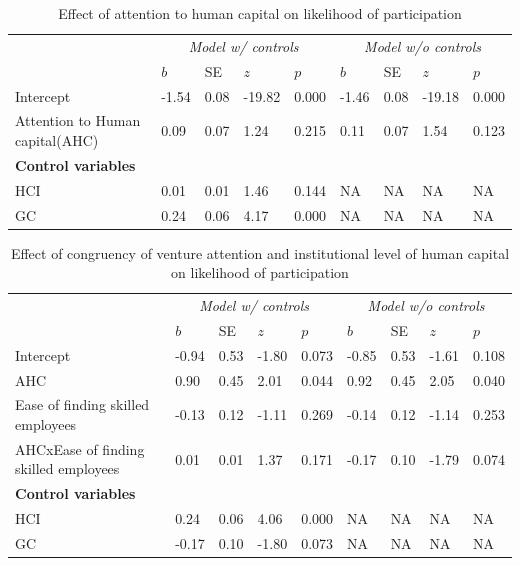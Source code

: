 \documentclass[
  english,
  man]{apa6}
\begin{document}
\begin{table}

\caption{\label{tab:unnamed-chunk-18}Effect of attention to human capital on likelihood of participation}
\centering
\begin{tabular}[t]{l|l|l|l|l|l|l|l|l}
\hline
\multicolumn{1}{c|}{\em{ }} & \multicolumn{4}{c|}{\em{Model w/ controls}} & \multicolumn{4}{c}{\em{Model w/o controls}} \\
\cline{2-5} \cline{6-9}
  & $b$ & SE & $z$ & $p$ & $b$ & SE & $z$ & $p$\\
\hline
Intercept & -1.54 & 0.08 & -19.82 & 0.000 & -1.46 & 0.08 & -19.18 & 0.000\\
\hline
Attention to Human capital(AHC) & 0.09 & 0.07 & 1.24 & 0.215 & 0.11 & 0.07 & 1.54 & 0.123\\
\hline
\multicolumn{9}{l}{\textbf{Control variables}}\\
\hline
\hspace{1em}HCI & 0.01 & 0.01 & 1.46 & 0.144 & NA & NA & NA & NA\\
\hline
\hspace{1em}GC & 0.24 & 0.06 & 4.17 & 0.000 & NA & NA & NA & NA\\
\hline
\end{tabular}
\end{table}

\begin{table}

\caption{\label{tab:unnamed-chunk-18}Effect of congruency of venture attention and institutional level of human capital on likelihood of participation}
\centering
\begin{tabular}[t]{l|l|l|l|l|l|l|l|l}
\hline
\multicolumn{1}{c|}{\em{ }} & \multicolumn{4}{c|}{\em{Model w/ controls}} & \multicolumn{4}{c}{\em{Model w/o controls}} \\
\cline{2-5} \cline{6-9}
  & $b$ & SE & $z$ & $p$ & $b$ & SE & $z$ & $p$\\
\hline
Intercept & -0.94 & 0.53 & -1.80 & 0.073 & -0.85 & 0.53 & -1.61 & 0.108\\
\hline
AHC & 0.90 & 0.45 & 2.01 & 0.044 & 0.92 & 0.45 & 2.05 & 0.040\\
\hline
Ease of finding skilled employees & -0.13 & 0.12 & -1.11 & 0.269 & -0.14 & 0.12 & -1.14 & 0.253\\
\hline
AHCxEase of finding skilled employees & 0.01 & 0.01 & 1.37 & 0.171 & -0.17 & 0.10 & -1.79 & 0.074\\
\hline
\multicolumn{9}{l}{\textbf{Control variables}}\\
\hline
\hspace{1em}HCI & 0.24 & 0.06 & 4.06 & 0.000 & NA & NA & NA & NA\\
\hline
\hspace{1em}GC & -0.17 & 0.10 & -1.80 & 0.073 & NA & NA & NA & NA\\
\hline
\end{tabular}
\end{table}
\end{document}
